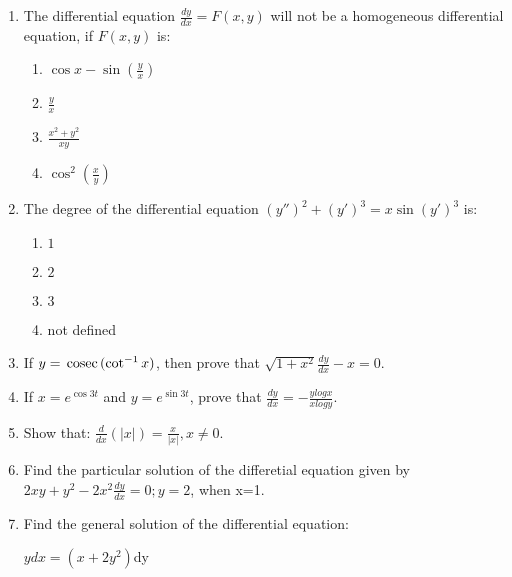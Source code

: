 \begin{enumerate}
	\item The differential equation $\frac{dy}{dx}=F(x,y)$ will not be a homogeneous differential equation, if $F(x,y)$ is:
		\begin{enumerate}
			\item $\cos x - \sin (\frac{y}{x})$
			\item $\frac{y}{x}$
			\item $\frac{x^{2} + y^{2}}{xy}$
			\item $\cos^{2}(\frac{x}{y})$
		\end{enumerate}
	\item The degree of the differential equation $(y'')^{2} + (y')^{3} = x\sin(y')^{3}$ is:
		\begin{enumerate}
			\item $1$
			\item $2$
			\item $3$
			\item not defined
		\end{enumerate}
	\item If $y=\,\text{cosec}\, (\cot^{-1} x)$, then prove that $\sqrt{1 + x^{2}} \frac{dy}{dx} -x = 0$.
	\item If $x=e^{\cos 3t}$ and $y=e^{\sin 3t}$, prove that $\frac{dy}{dx} = -\frac{ylogx}{xlogy}$.
	\item Show that: $\frac{d}{dx} (|x|)=\frac{x}{|x|}, x\neq0$.
	\item  Find the particular solution of the differetial equation given by $2xy + y^{2} - 2x^{2} \frac{dy}{dx} = 0; y=2$, when x=1.
	\item Find the general solution of the differential equation:\\
		\centerline {$ydx = (x + 2y^{2})$dy}
\end{enumerate}
